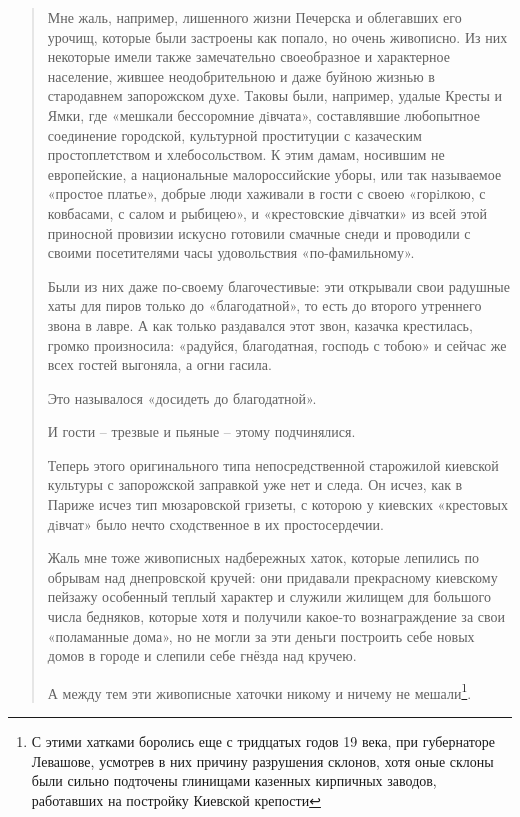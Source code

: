 \begin{quotation}
Мне жаль, например, лишенного жизни Печерска и облегавших его урочищ, которые были застроены  как попало, но очень живописно. Из них некоторые  имели также замечательно своеобразное и характерное  население, жившее неодобрительною  и даже буйною жизнью в стародавнем  запорожском  духе. Таковы были, например, удалые Кресты и Ямки, где «мешкали бессоромние дiвчата», составлявшие любопытное соединение городской, культурной проституции с казаческим простоплетством и хлебосольством. К этим дамам,  носившим не европейские, а национальные малороссийские уборы, или так называемое  «простое  платье», добрые люди хаживали в гости с  своею «горiлкою, с ковбасами, с салом и рыбицею», и «крестовские дiвчатки» из всей этой приносной провизии искусно готовили смачные снеди и  проводили с своими посетителями часы удовольствия «по-фамильному». 

Были из них даже по-своему благочестивые: эти открывали свои радушные хаты для пиров только до «благодатной», то есть до второго утреннего звона в лавре. А как только раздавался этот звон, казачка  крестилась, громко произносила: «радуйся, благодатная, господь с тобою» и сейчас же всех гостей выгоняла, а огни гасила. 

Это называлося «досидеть до благодатной».

И гости – трезвые и пьяные – этому подчинялися. 

Теперь этого оригинального типа непосредственной старожилой киевской культуры с запорожской  заправкой уже нет и следа. Он исчез, как в Париже исчез тип мюзаровской гризеты, с которою у киевских «крестовых дiвчат» было нечто сходственное в их простосердечии. 

Жаль мне тоже живописных надбережных хаток, которые лепились по обрывам над днепровской кручей: они придавали прекрасному киевскому пейзажу особенный  теплый характер и служили жилищем для большого числа бедняков, которые  хотя  и получили какое-то вознаграждение за свои «поламанные дома», но не могли за эти деньги построить себе новых домов в городе и слепили себе гнёзда  над  кручею. 

А между тем эти живописные хаточки никому и ничему не мешали\footnote{С этими хатками боролись еще с тридцатых годов 19 века, при губернаторе Левашове, усмотрев в них причину разрушения склонов, хотя оные склоны были сильно подточены глинищами казенных кирпичных заводов, работавших на постройку Киевской крепости}.
\end{quotation}

